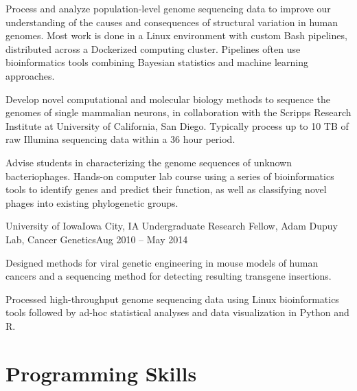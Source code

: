         \resumeItemListStart

            {Process and analyze population-level genome sequencing data to improve our understanding of the causes and consequences of structural variation in human genomes. Most work is done in a Linux environment with custom Bash pipelines, distributed across a Dockerized computing cluster. Pipelines often use bioinformatics tools combining Bayesian statistics and machine learning approaches.}
            
            {Develop novel computational and molecular biology methods to sequence the genomes of single mammalian neurons, in collaboration with the Scripps Research Institute at University of California, San Diego. Typically process up to 10 TB of raw Illumina sequencing data within a 36 hour period.}
            
            {Advise students in characterizing the genome sequences of unknown bacteriophages. Hands-on computer lab course using a series of bioinformatics tools to identify genes and predict their function, as well as classifying novel phages into existing phylogenetic groups.}

        \resumeItemListEnd

        \resumeSubheading
        {University of Iowa}{Iowa City, IA}
        {Undergraduate Research Fellow, Adam Dupuy Lab, Cancer Genetics}{Aug 2010 -- May 2014}

        \resumeItemListStart

            {Designed methods for viral genetic engineering in mouse models of human cancers and a sequencing method for detecting resulting transgene insertions.}
            
            {Processed high-throughput genome sequencing data using Linux bioinformatics tools followed by ad-hoc statistical analyses and data visualization in Python and R.}

        \resumeItemListEnd

    \resumeSubHeadingListEnd
    
\section{Programming Skills}
    \resumeSubHeadingListStart

